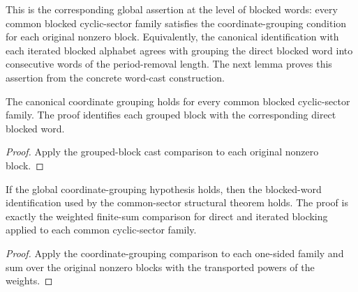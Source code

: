 \begin{definition}%
\label{def:common_grouped_block_cast_hypothesis}
	\leanok
	This is the corresponding global assertion at the level of blocked words: every
	common blocked cyclic-sector family satisfies the coordinate-grouping condition
	for each original nonzero block.  Equivalently, the canonical identification with
	each iterated blocked alphabet agrees with grouping the direct blocked word into
	consecutive words of the period-removal length.  The next lemma proves this
	assertion from the concrete word-cast construction.
\end{definition}

	\begin{lemma}%
	\label{lem:common_grouped_block_cast_of_flatten_word}
		\leanok
		The canonical coordinate grouping holds for every common blocked
		cyclic-sector family.  The proof identifies each grouped block with the
		corresponding direct blocked word.
	\end{lemma}

	\begin{proof}\leanok
		Apply the grouped-block cast comparison to each original nonzero block.
	\end{proof}

	\begin{lemma}%
\label{lem:common_grouped_block_cast_to_relabeling}
	\leanok
		If the global coordinate-grouping hypothesis holds, then the blocked-word
		identification used by the common-sector structural theorem holds.  The
	proof is exactly the weighted finite-sum comparison for direct and iterated
	blocking applied to each common cyclic-sector family.
\end{lemma}

\begin{proof}
	\leanok
	Apply the coordinate-grouping comparison to each one-sided family and sum over
	the original nonzero blocks with the transported powers of the weights.
\end{proof}

